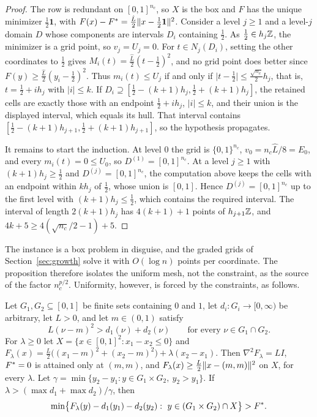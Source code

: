 \begin{proof}
The row is redundant on $[0,1]^{n_c}$, so $X$ is the box and $F$ has the
unique minimizer $\frac12\mathbf 1$, with $F(x)-F^*=\frac{\hat L}2\lVert x-\frac12\mathbf 1\rVert^2$.
Consider a level $j\ge1$ and a level-$j$ domain $D$ whose components are
intervals $D_i$ containing $\frac12$. As $\frac12\in h_j\mathbb Z$, the minimizer is a
grid point, so $v_j=U_j=0$. For $t\in N_j(D_i)$, setting the other
coordinates to $\frac12$ gives $M_i(t)=\frac{\hat L}2(t-\frac12)^2$, and no
grid point does better since $F(y)\ge\frac{\hat L}2(y_i-\frac12)^2$. Thus
$m_i(t)\le U_j$ if and only if $\lvert t-\frac12\rvert\le\frac{\sqrt{n_c}}2h_j$, that
is, $t=\frac12+ih_j$ with $\lvert i\rvert\le k$. If
$D_i\supseteq[\frac12-(k+1)h_j,\frac12+(k+1)h_j]$, the retained cells are exactly
those with an endpoint $\frac12+ih_j$, $\lvert i\rvert\le k$, and their union is the
displayed interval, which equals its hull. That interval contains
$[\frac12-(k+1)h_{j+1},\frac12+(k+1)h_{j+1}]$, so the hypothesis propagates.

It remains to start the induction. At level $0$ the grid is $\{0,1\}^{n_c}$,
$v_0=n_c\hat L/8=E_0$, and every $m_i(t)=0\le U_0$, so $D^{(1)}=[0,1]^{n_c}$. At
a level $j\ge1$ with $(k+1)h_j\ge\frac12$ and $D^{(j)}=[0,1]^{n_c}$, the computation
above keeps the cells with an endpoint within $kh_j$ of $\frac12$, whose union
is $[0,1]$. Hence $D^{(j)}=[0,1]^{n_c}$ up to the first level with
$(k+1)h_j\le\frac12$, which contains the required interval. The interval of
length $2(k+1)h_j$ has $4(k+1)+1$ points of $h_{j+1}\mathbb Z$, and
$4k+5\ge4(\sqrt{n_c}/2-1)+5$.
\end{proof}

The instance is a box problem in disguise, and the graded grids of
Section~\ref{sec:growth} solve it with $O(\log n)$ points per coordinate. The
proposition therefore isolates the uniform mesh, not the constraint, as the
source of the factor $n_c^{p/2}$. Uniformity, however, is forced by the
constraints, as follows.

\begin{proposition}\label{prop:tu-misaligned}
Let $G_1,G_2\subseteq[0,1]$ be finite sets containing $0$ and $1$, let
$d_i:G_i\to[0,\infty)$ be arbitrary, let $L>0$, and let $m\in(0,1)$ satisfy
\begin{equation}\label{eq:tu-gap}
L(\nu-m)^2>d_1(\nu)+d_2(\nu)\qquad\text{for every }\nu\in G_1\cap G_2 .
\end{equation}
For $\lambda\ge0$ let $X=\{x\in[0,1]^2:x_1-x_2\le0\}$ and
$F_\lambda(x)=\frac L2\bigl((x_1-m)^2+(x_2-m)^2\bigr)+\lambda(x_2-x_1)$. Then
$\nabla^2F_\lambda=LI$, $F^*=0$ is attained only at $(m,m)$, and
$F_\lambda(x)\ge\frac L2\lVert x-(m,m)\rVert^2$ on $X$, for every $\lambda$. Let
$\gamma=\min\{y_2-y_1:y\in G_1\times G_2,\ y_2>y_1\}$. If
$\lambda>(\max d_1+\max d_2)/\gamma$, then
\[
\min\bigl\{F_\lambda(y)-d_1(y_1)-d_2(y_2):\ y\in(G_1\times G_2)\cap X\bigr\}>\OPT .
\]
\end{proposition}

